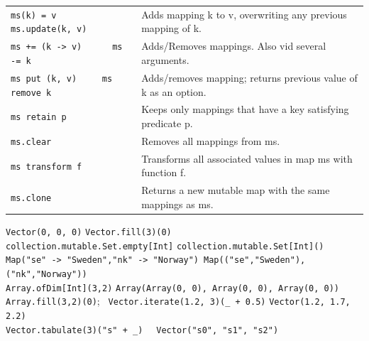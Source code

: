 \documentclass[article, a5paper]{memoir}
\newcommand{\LangColor}{red}
\newcommand{\head}[1]{{\bfseries {\color{\LangColor}{#1}}\par\vspace{1mm}\hrule\vspace{-2mm}}}
\renewcommand{\arraystretch}{0.9}
\newcommand{\code}{\lstinline[basicstyle=\ttfamily]}
\newcommand{\Newline}{\vspace{\baselineskip}}
\newcommand{\Comment}[1]{{\color{commentgreen}{#1}}}
\begin{document}
{\small\renewcommand{\arraystretch}{1.125}
\begin{tabular}{@{}p{5.0cm}  p{6.8cm}}

\texttt{ms(k) = v ~~ ms.update(k, v)} & Adds mapping k to v, overwriting any previous mapping of k.\\   \cline{1-2}

\texttt{ms += (k -> v) ~~~~ ms -= k} & Adds/Removes mappings. Also vid several arguments.\\   \cline{1-2}

\texttt{ms put (k, v) ~~~ ms remove k}& Adds/removes mapping; returns previous value of k as an option.\\   \cline{1-2}

\texttt{ms retain p} & Keeps only mappings that have a key satisfying predicate p.\\   \cline{1-2}

\texttt{ms.clear} & Removes all mappings from ms.\\   \cline{1-2}

\texttt{ms transform f} & Transforms all associated values in map ms with function f.\\   \cline{1-2}

\code|ms.clone| & Returns a new mutable map with the same mappings as ms.\\   \cline{1-2}
        
\end{tabular}
}  

\vspace{1.0em}\head{Factory examples:}\Newline

{\small%
\code{Vector(0, 0, 0)} \Comment{ same as } \code{Vector.fill(3)(0)} \\
\code{collection.mutable.Set.empty[Int]} \Comment{ same as } \code{collection.mutable.Set[Int]()}\\
\mbox{\code{Map("se" -> "Sweden","nk" -> "Norway")} \Comment{same as } 
\code{Map(("se","Sweden"),("nk","Norway"))}}\\
\code{Array.ofDim[Int](3,2)} \Comment{gives} \texttt{Array(Array(0, 0), Array(0, 0), Array(0, 0))} \Comment{same as} \texttt{Array.fill(3,2)(0)}; 
\texttt{ Vector.iterate(1.2, 3)(\_ + 0.5)} \Comment{gives} \texttt{Vector(1.2, 1.7, 2.2)}\\
\texttt{Vector.tabulate(3)("s" + \_) } \Comment{gives} \code{ Vector("s0", "s1", "s2")}
}




\clearpage

\Newline\head{Strings}\Newline
\end{document}
